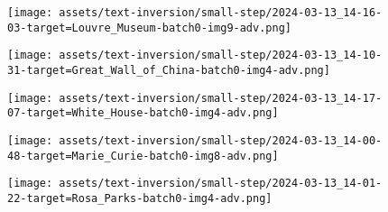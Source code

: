 \begin{figure*}[]
\vspace{0.5ex}
\begin{minipage}[t]{.025\textwidth}
     \vspace{0pt}
\end{minipage}%
\hspace{1ex}
\begin{minipage}[t]{0.98\textwidth}
    \vspace{0pt}
    \begin{subfigure}[t]{0.2\textwidth}
        \texttt{[image: assets/text-inversion/small-step/2024-03-13\_14-16-03-target=Louvre\_Museum-batch0-img9-adv.png]}
    \end{subfigure}%
    \begin{subfigure}[t]{0.2\textwidth}
        \texttt{[image: assets/text-inversion/small-step/2024-03-13\_14-10-31-target=Great\_Wall\_of\_China-batch0-img4-adv.png]}
    \end{subfigure}%
    \begin{subfigure}[t]{0.2\textwidth}
        \texttt{[image: assets/text-inversion/small-step/2024-03-13\_14-17-07-target=White\_House-batch0-img4-adv.png]}
    \end{subfigure}%
    \begin{subfigure}[t]{0.2\textwidth}
        \texttt{[image: assets/text-inversion/small-step/2024-03-13\_14-00-48-target=Marie\_Curie-batch0-img8-adv.png]}
    \end{subfigure}%
    \begin{subfigure}[t]{0.2\textwidth}
        \texttt{[image: assets/text-inversion/small-step/2024-03-13\_14-01-22-target=Rosa\_Parks-batch0-img4-adv.png]}
    \end{subfigure}%
\end{minipage}


\end{figure*}
